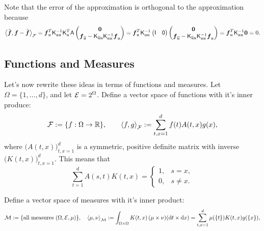 \documentclass[reqno]{amsart}
\begin{document}
Note that the error of the approximation is orthogonal to the approximation because \begin{equation*}
    \ip[\cf]{\tvf}{\vf - \tvf} = \vf_\fu^T \mK^{-1}_{\fu\fu}  \mK_\fu^T \mA \begin{pmatrix} \vzero \\ \vf_{\overline{\fu}} - \mK_{\overline{\fu} \fu } \mK_{\fu\fu}^{-1} \vf_\fu \end{pmatrix} =  \vf_\fu^T \mK^{-1}_{\fu\fu}  \begin{pmatrix} \mI & \mzero \end{pmatrix} \begin{pmatrix} \vzero \\ \vf_{\overline{\fu}} - \mK_{\overline{\fu} \fu } \mK_{\fu\fu}^{-1} \vf_\fu \end{pmatrix}  
    = \vf_\fu^T \mK^{-1}_{\fu\fu} \vzero = 0.
\end{equation*}



\subsection{Functions and Measures}
Let's now rewrite these ideas in terms of functions and measures.  Let $\Omega = \{1, \ldots, d\}$, and let $\ce = 2^\Omega$.  Define a vector space of functions with it's inner produce:
\begin{equation*}
    \cf : = \{f : \Omega \to \reals\}, \qquad \ip[\cf]{f}{g} := \sum_{t,x=1}^d f(t) A(t,x) g(x),
\end{equation*}
where $\bigl( A(t,x) \bigr)_{t,x = 1}^d$ is a symmetric, positive definite matrix with inverse $\bigl( K(t,x) \bigr)_{t,x = 1}^d$.  This means that
\begin{equation} \label{eq:AKeqI}
    \sum_{t=1}^d A(s,t)K(t,x) = \begin{cases} 1, & s=x, \\ 0, & s\ne x. \end{cases}
\end{equation}

Define a vector space of measures with it's inner product:
\begin{equation*}
    \cm : = \{\text{all measures } (\Omega, \ce, \mu) \}, \quad 
    \ip[\cm]{\mu}{\nu} := \int_{\Omega \times \Omega} K(t,x) \, (\mu \times \nu) (\dif t \times \dif x) = \sum_{t,x=1}^d \mu(\{t\}) K(t,x) g(\{x\}),
\end{equation*}
\end{document}
